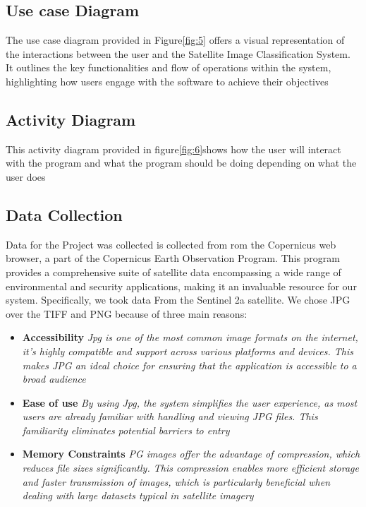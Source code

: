 \subsection{Use case Diagram}\label{subsec:use-case-diagram}

The use case diagram provided in Figure\ref{fig:5} offers a visual representation of the interactions between the user and the Satellite Image Classification System.
It outlines the key functionalities and flow of operations within the system,
highlighting how users engage with the software to achieve their objectives

\subsection{Activity Diagram}\label{subsec:activity-diagram}

This activity diagram provided in figure\ref{fig:6}shows how the user will interact with the program and what the program should be doing depending on what the user does


\subsection{Data Collection}\label{subsec:data-collection}

Data for the Project was collected is collected from rom the Copernicus web browser, a part of the Copernicus Earth Observation Program.
This program provides a comprehensive suite of satellite data encompassing a wide range of environmental and security applications,
making it an invaluable resource for our system.
Specifically, we took data From the Sentinel 2a satellite.
We chose JPG over the TIFF and PNG because of three main reasons:

\begin{itemize}
    \item \textbf{Accessibility}
    \textit{Jpg is one of the most common image formats on the internet, it's highly compatible and support across various platforms and devices. 
    This makes JPG an ideal choice for ensuring that the application is accessible to a broad audience }
    \item \textbf{Ease of use}
    \textit{By using Jpg, the system simplifies the user experience, as most users are already familiar with handling and viewing JPG files.
    This familiarity eliminates potential barriers to entry}
    \item \textbf{Memory Constraints}
    \textit{ PG images offer the advantage of compression, which reduces file sizes significantly.
    This compression enables more efficient storage and faster transmission of images,
        which is particularly beneficial when dealing with large datasets typical in satellite imagery}
\end{itemize}

